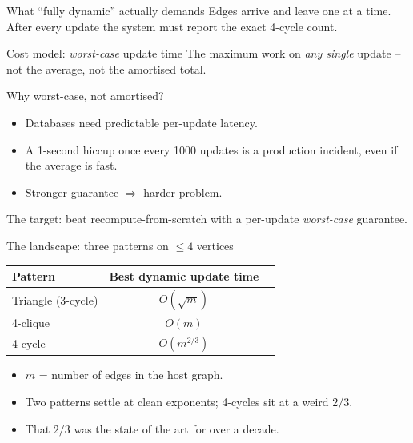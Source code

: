 \documentclass[aspectratio=169,10pt]{beamer}
\newcommand{\bigO}{O}
\begin{document}
\begin{frame}{What ``fully dynamic'' actually demands}
  Edges arrive and leave one at a time. After every update the system must report the exact 4-cycle count.

  \vspace{0.4em}
  \begin{block}{Cost model: \emph{worst-case} update time}
    The maximum work on \emph{any single} update -- not the average, not the amortised total.
  \end{block}

  \vspace{0.4em}
  Why worst-case, not amortised?
  \begin{itemize}
    \item Databases need \alert{predictable per-update latency}.
    \item A 1-second hiccup once every 1000 updates is a production incident, even if the average is fast.
    \item Stronger guarantee $\Rightarrow$ harder problem.
  \end{itemize}

  \vspace{0.4em}
  The target: beat recompute-from-scratch with a per-update \emph{worst-case} guarantee.
\end{frame}


\begin{frame}{The landscape: three patterns on $\le 4$ vertices}
  \centering
  \vspace{0.5em}
  \begin{tabular}{lcc}
    \toprule
    Pattern & Best dynamic update time \\
    \midrule
    Triangle (3-cycle) & $\bigO(\sqrt{m})$ \\
    4-clique           & $\bigO(m)$ \\
    \alert{4-cycle}    & \alert{$\bigO(m^{2/3})$} \\
    \bottomrule
  \end{tabular}

  \vspace{1.5em}
  \begin{itemize}
    \item $m$ = number of edges in the host graph.
    \item Two patterns settle at clean exponents; \alert{4-cycles sit at a weird $2/3$}.
    \item That $2/3$ was the state of the art for over a decade.
  \end{itemize}
\end{frame}
\end{document}
